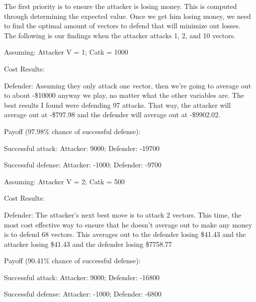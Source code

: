 \documentclass[11pt,journal]{IEEEtran}
\begin{document}
\par The first priority is to ensure the attacker is losing money. This is computed through determining the expected value. Once we get him losing money, we need to find the optimal amount of vectors to defend that will minimize out losses. The following is our findings when the attacker attacks 1, 2, and 10 vectors.\\

\par
Assuming: Attacker V = 1; Catk = 1000\\

\par
Cost Results:\\

\par
Defender: Assuming they only attack one vector, then we're going to average out to about -\$10000 anyway we play, no matter what the other variables are. The best results I found were defending 97 attacks. That way, the attacker will average out at -\$797.98 and the defender will average out at -\$9902.02.\newline
 

\par
Payoff (97.98\% chance of successful defense):
\par
Successful attack:
Attacker: 9000;
Defender: -19700
\par
Successful defense:
Attacker: -1000;
Defender: -9700\newline

\par
Assuming: Attacker V = 2; Catk = 500\\

\par
Cost Results:\\

\par
Defender: The attacker's next best move is to attack 2 vectors. This time, the most cost effective way to ensure that he doesn't average out to make any money is to defend 68 vectors. This averages out to the defender losing \$41.43 and the attacker losing \$41.43 and the defender losing \$7758.77\newline

\par
Payoff (90.41\% chance of successful defense): 
\par
Successful attack:
Attacker: 9000;
Defender: -16800
\par
Successful defense:
Attacker: -1000;
Defender: -6800\newline
\end{document}
